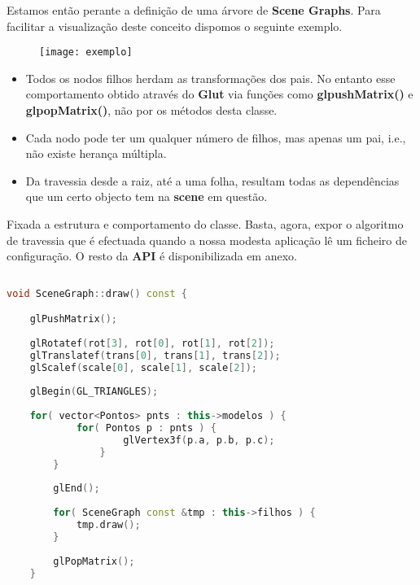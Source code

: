 \documentclass{article}
\begin{document}
Estamos então perante a definição de uma árvore de \textbf{Scene Graphs}. Para facilitar a visualização deste conceito dispomos o seguinte exemplo.

\begin{figure}[H]
    \centering
    \texttt{[image: exemplo]}
\end{figure}

\begin{info}
    \begin{itemize}
        \item Todos os nodos filhos herdam as transformações dos pais. No entanto esse comportamento obtido através do \textbf{Glut} via funções como \textbf{glpushMatrix()} e \textbf{glpopMatrix()}, não por os métodos desta classe.  
        \item Cada nodo pode ter um qualquer número de filhos, mas apenas um pai, i.e., não existe herança múltipla.
        \item Da travessia desde a raiz, até a uma folha, resultam todas as dependências que um certo objecto tem na \textbf{scene} em questão.
    \end{itemize}
\end{info}

Fixada a estrutura e comportamento do classe. Basta, agora, expor o algoritmo de travessia que é efectuada quando a nossa modesta aplicação lê um ficheiro de configuração. O resto da \textbf{API} é disponibilizada em anexo.

\begin{file}
    \begin{lstlisting}[language=C++]
        
void SceneGraph::draw() const {

    glPushMatrix();
            
    glRotatef(rot[3], rot[0], rot[1], rot[2]);
    glTranslatef(trans[0], trans[1], trans[2]);
    glScalef(scale[0], scale[1], scale[2]);
            
    glBegin(GL_TRIANGLES);
            
    for( vector<Pontos> pnts : this->modelos ) {        
            for( Pontos p : pnts ) {
                    glVertex3f(p.a, p.b, p.c);
                }
        }
        
        glEnd();
        
        for( SceneGraph const &tmp : this->filhos ) {
            tmp.draw();
        }
        
        glPopMatrix();
    }
        
    \end{lstlisting}
\end{file}
\end{document}
